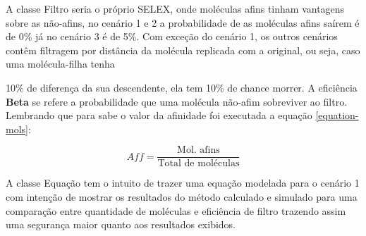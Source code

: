 A classe Filtro seria o próprio SELEX, onde moléculas afins tinham vantagens
sobre as não-afins, no cenário 1 e 2 a probabilidade de as moléculas afins saírem é de 0\%
já no cenário 3 é de 5\%. Com exceção do cenário 1, os outros cenários contêm filtragem
por distância da molécula replicada com a original, ou seja, caso uma molécula-filha tenha

10\% de diferença da sua descendente, ela tem 10\% de chance morrer. A eficiência \textbf{Beta}
se refere a probabilidade que uma molécula não-afim sobreviver ao filtro. Lembrando que
para sabe o valor da afinidade foi executada a equação \ref{equation-mols}:

\begin{equation}
    \label{equation-mols}
    Aff = \frac{\text{Mol. afins}}{\text{Total de moléculas}}
\end{equation}

A classe Equação tem o intuito de trazer uma equação modelada para o cenário 1
com intenção de mostrar os resultados do método calculado e simulado para uma
comparação entre quantidade de moléculas e eficiência de filtro trazendo assim uma
segurança maior quanto aos resultados exibidos.

